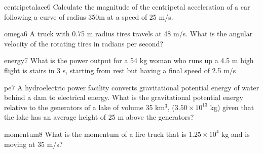 \documentclass[letterpaper]{article}
\begin{document}
{ 
\begin{question}{centripetalacc6}
  Calculate the magnitude of the centripetal acceleration of a car
  following a curve of radius 350m at a speed of 25 m/s.
\begin{choices}
\end{choices}
\end{question}

\begin{question}{omega6}
  A truck with 0.75 m radius tires travels at 48 m/s. What is the
  angular velocity of the rotating tires in radians per second?
\begin{choices}
\end{choices}
\end{question}

\begin{question}{energy7}
  What is the power output for a 54 kg woman who runs up a 4.5 m high
  flight is stairs in 3 s, starting from rest but having a final speed
  of 2.5 m/s
\begin{choices}
\end{choices}
\end{question}

\begin{question}{pe7}
  A hydroelectric power facility converts gravitational potential
  energy of water behind a dam to electrical energy.  What is the
  gravitational potential energy relative to the generators of a lake
  of volume 35 km$^3$, ($3.50 \times 10^{13}$ kg) given that the lake
  has an average height of 25 m above the generators?
\begin{choices}
\end{choices}
\end{question}

\begin{question}{momentum8}
  What is the momentum of a fire truck that is $1.25 \times 10^4$ kg
  and is moving at 35 m/s?
  \begin{choices}
\end{choices}
\end{question}

}
\end{document}
